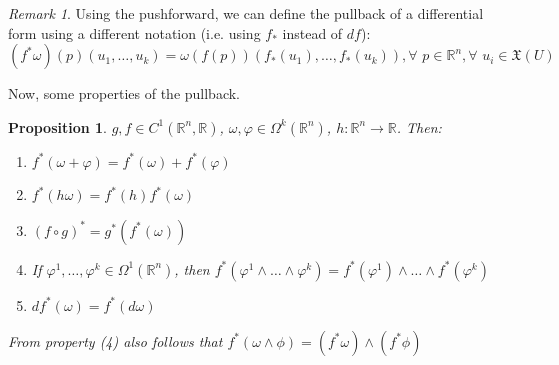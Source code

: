 \documentclass[a4paper,11pt,titlepage, article, oneside]{memoir}
\numberwithin{equation}{section}
\newtheorem{proposition}[theorem]{Proposition}
\theoremstyle{definition}
\theoremstyle{remark}
\newtheorem{remark}[theorem]{Remark}
\newcommand{\rfield}{\mathbb{R}}
\begin{document}
\begin{remarkbox}\begin{remark}
Using the pushforward, we can define the pullback of a differential form using a different notation (i.e. using $f_*$ instead of $df$):
  \begin{equation}
    (f^* \omega)(p) (u_1, \ldots, u_k) = \omega (f(p)) (f_*(u_1), \ldots, f_*(u_k)), \forall\, \, p \in \rfield^n, \forall \,\, u_i \in \mathfrak{X}(U)
  \end{equation}
\end{remark}\end{remarkbox}

Now, some properties of the pullback.

\begin{proposition} \label{pullbackprop}
  $g, f \in C^1(\rfield^n, \rfield)$, $\omega, \varphi \in \Omega^k(\rfield^n)$, $h\colon \rfield^n \rightarrow \rfield$. Then:
  \begin{enumerate}
    \item $f^*(\omega + \varphi) = f^*(\omega) + f^*(\varphi)$
    \item $f^*(h \omega) = f^*(h)f^*(\omega)$
    \item $(f \circ g)^* = g^*(f^*(\omega))$
    \item If $\varphi^1, \ldots, \varphi^k \in \Omega^1(\rfield^n)$, then $f^*(\varphi^1 \wedge \ldots \wedge \varphi^k) = f^*(\varphi^1) \wedge \ldots \wedge f^*(\varphi^k)$
    \item $df^*(\omega) = f^*(d\omega)$
  \end{enumerate}
  From property (4) also follows that $f^*(\omega \wedge \phi) = (f^*\omega) \wedge (f^* \phi)$
\end{proposition}
\end{document}
